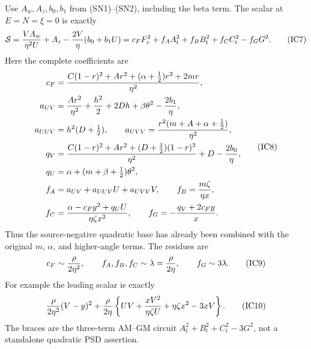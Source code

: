 Use $A_w,A_z,b_0,b_1$ from (SN1)--(SN2), including the beta term.
The scalar at $E=N=\xi=0$ is exactly
\[
 \mathcal S={VA_w\over\eta^2U}+A_z
                  -{2V\over\eta}(b_0+b_1U)
       =c_FF_v^2+f_AA_t^2+f_BB_t^2+f_CC_t^2-f_GG^2.    \tag{IC7}
\]
Here the complete coefficients are
\[
\begin{aligned}
 c_F={}&{C(1-r)^2+Ar^2+(\alpha+\tfrac12)r^2+2mr\over\eta^2},\\
 a_{UV}={}&{Ar^2\over\eta^2}+{h^2\over2}+2Dh+\beta\theta^2
                                     -{2b_1\over\eta},\\
 a_{UUV}={}&h^2(D+\tfrac12),\qquad
 a_{UVV}={r^2(m+A+\alpha+\tfrac12)\over\eta^2},\\
 q_V={}&{C(1-r)^2+Ar^2+(D+\tfrac12)(1-r)^2\over\eta^2}
                                     +D-{2b_0\over\eta},\\
 q_U={}&\alpha+(m+\beta+\tfrac12)\theta^2,\\
 f_A={}&a_{UV}+a_{UUV}U+a_{UVV}V,\qquad
 f_B={m\zeta\over\eta x},\\
 f_C={}&{\alpha-c_Fy^2+q_UU\over\eta\zeta x^2},\qquad
 f_G=-{q_V+2c_Fy\over x}.                              \end{aligned} \tag{IC8}
\]
Thus the source-negative quadratic base has already been combined
with the original $m$, $\alpha$, and higher-angle terms. The residues
are
\[
 c_F\sim{\rho\over2\eta^2},\qquad
 f_A,f_B,f_C\sim\lambda={\rho\over2\eta},\qquad
 f_G\sim3\lambda.                                    \tag{IC9}
\]
For example the leading scalar is exactly
\[
 {\rho\over2\eta^2}(V-y)^2+
 {\rho\over2\eta}\left\{UV+{xV^2\over\eta\zeta U}
                            +\eta\zeta x^2-3xV\right\}.
                                                               \tag{IC10}
\]
The braces are the three-term AM--GM circuit
$A_t^2+B_t^2+C_t^2-3G^2$, not a standalone quadratic PSD assertion.

